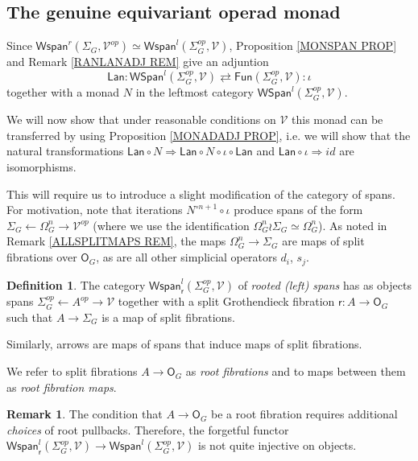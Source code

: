 \documentclass[a4paper,10pt
,draft
]{article}%
\numberwithin{equation}{section}
\numberwithin{figure}{section}
\theoremstyle{definition} %
\newtheorem{definition}[equation]{Definition}%
\newtheorem{remark}[equation]{Remark}%
\newcommand{\1}{\ensuremath{\mathbbm 1}}%
\begin{document}
\subsection{The genuine equivariant operad monad} \label{FGMON SEC}


Since 
$\mathsf{Wspan}^r(\Sigma_G,\mathcal{V}^{op}) \simeq 
\mathsf{Wspan}^l(\Sigma_G^{op},\mathcal{V})$,
Proposition \ref{MONSPAN PROP} and Remark \ref{RANLANADJ REM} give an adjuntion
\[
	\mathsf{Lan} \colon
	\mathsf{WSpan}^l(\Sigma^{op}_G, \mathcal{V})
		\rightleftarrows
	\mathsf{Fun}(\Sigma^{op}_G, \mathcal{V})
	\colon \iota
\]
together with a monad $N$ in the leftmost category $\mathsf{WSpan}^l(\Sigma^{op}_G, \mathcal{V})$.


We will now show that under reasonable conditions on 
$\mathcal{V}$ this monad can be transferred by using 
Proposition \ref{MONADADJ PROP},
i.e. we will show that the natural transformations 
$
\mathsf{Lan} \circ N \Rightarrow \mathsf{Lan} \circ N \circ \iota \circ \mathsf{Lan}
$
and
$\mathsf{Lan} \circ \iota \Rightarrow id$
are isomorphisms.

This will require us to introduce a slight modification of the category of spans.
For motivation, note that iterations
$N^{\circ n+1} \circ \iota$ produce spans of the form
$\Sigma_G \leftarrow \Omega_G^{n} \to \mathcal{V}^{op}$
(where we use the identification $\Omega_G^{n} \wr \Sigma_G \simeq \Omega_G^{n}$). 
As noted in Remark \ref{ALLSPLITMAPS REM}, the maps 
$\Omega_G^{n} \to \Sigma_G$ are maps of split fibrations over $\mathsf{O}_G$, as are all other simplicial operators $d_i$, $s_j$.

\begin{definition}
The category $\mathsf{Wspan}^l_{\mathsf{r}}(\Sigma_G^{op},\mathcal{V})$ of \textit{rooted (left) spans}
has as objects spans
$\Sigma_G^{op} \leftarrow A^{op} \to \mathcal{V}$
together with a split Grothendieck fibration 
$\mathsf{r} \colon A \to \mathsf{O}_G$
such that $A \to \Sigma_G$ is a map of split fibrations.

Similarly, arrows are maps of spans that induce maps of split fibrations.
\end{definition}

We refer to split fibrations $A \to \mathsf{O}_G$
as \textit{root fibrations}
and to maps between them as \textit{root fibration maps}.

\begin{remark}
The condition that $A \to \mathsf{O}_G$
be a root fibration requires additional \textit{choices} of root pullbacks. Therefore, the forgetful functor 
$\mathsf{Wspan}^l_{\mathsf{r}}(\Sigma_G^{op},\mathcal{V})
\to
\mathsf{Wspan}^l(\Sigma_G^{op},\mathcal{V})$
is not quite injective on objects.
\end{remark}
\end{document}
